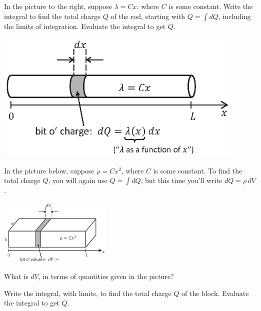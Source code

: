 \begin{enumerate}[labparts]
\vspace{-0.1in}
\begin{minipage}{0.54\textwidth}
\item In the picture to the right, suppose $\lambda = Cx$, where $C$ is some constant. Write the integral to find the total charge $Q$ of the rod, starting with $Q = \int dQ$, including the limits of integration.  Evaluate the integral to get $Q$.
\end{minipage}
\begin{minipage}{0.45\textwidth}
    \hspace{0.25in}\includegraphics[width=0.9\textwidth]{charge_density/fig3.eps}
\end{minipage}
\answerspace{0.4 in}


\pagebreak[2]

In the picture below, suppose $\rho = Cx^2$, where $C$ is some constant. To find the total charge $Q$, you will again use $Q = \int dQ$, but this time you'll write $dQ = \rho \,dV$.  
\vspace{-0.2 in}
\begin{center}
\includegraphics[width=0.40\textwidth]{charge_density/fig4.eps}
\end{center}

\item What is $dV$, in terms of quantities given in the picture?
\vspace{0.3in}

\item Write the integral, with limits, to find the total charge $Q$ of the block.  Evaluate the integral to get $Q$.
\vspace{1.0in}


\end{enumerate}
